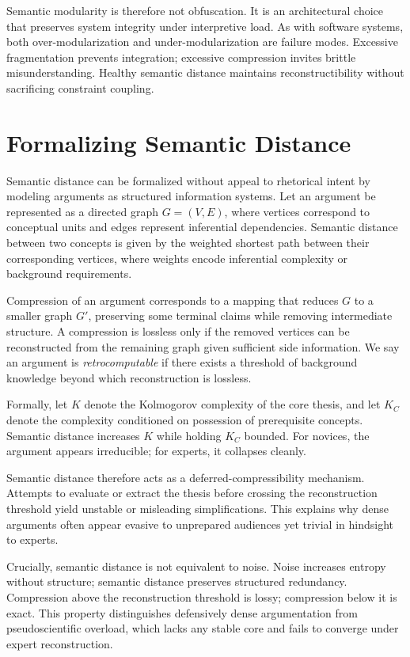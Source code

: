 Semantic modularity is therefore not obfuscation. It is an architectural choice that preserves system integrity under interpretive load. As with software systems, both over-modularization and under-modularization are failure modes. Excessive fragmentation prevents integration; excessive compression invites brittle misunderstanding. Healthy semantic distance maintains reconstructibility without sacrificing constraint coupling.

\section{Formalizing Semantic Distance}

Semantic distance can be formalized without appeal to rhetorical intent by modeling arguments as structured information systems. Let an argument be represented as a directed graph $G = (V, E)$, where vertices correspond to conceptual units and edges represent inferential dependencies. Semantic distance between two concepts is given by the weighted shortest path between their corresponding vertices, where weights encode inferential complexity or background requirements.

Compression of an argument corresponds to a mapping that reduces $G$ to a smaller graph $G'$, preserving some terminal claims while removing intermediate structure. A compression is lossless only if the removed vertices can be reconstructed from the remaining graph given sufficient side information. We say an argument is \emph{retrocomputable} if there exists a threshold of background knowledge beyond which reconstruction is lossless.

Formally, let $K$ denote the Kolmogorov complexity of the core thesis, and let $K_C$ denote the complexity conditioned on possession of prerequisite concepts. Semantic distance increases $K$ while holding $K_C$ bounded. For novices, the argument appears irreducible; for experts, it collapses cleanly.

Semantic distance therefore acts as a deferred-compressibility mechanism. Attempts to evaluate or extract the thesis before crossing the reconstruction threshold yield unstable or misleading simplifications. This explains why dense arguments often appear evasive to unprepared audiences yet trivial in hindsight to experts.

Crucially, semantic distance is not equivalent to noise. Noise increases entropy without structure; semantic distance preserves structured redundancy. Compression above the reconstruction threshold is lossy; compression below it is exact. This property distinguishes defensively dense argumentation from pseudoscientific overload, which lacks any stable core and fails to converge under expert reconstruction.


